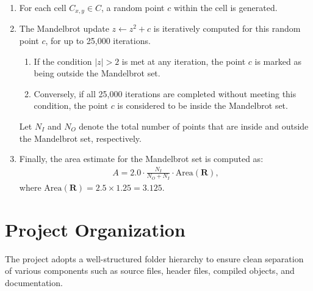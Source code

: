 \documentclass{article}
\begin{document}
\begin{enumerate}
    \item For each cell $C_{x, y} \in C$, a random point $c$ within the cell is generated.
    \item The Mandelbrot update $z \leftarrow z^2 + c$ is iteratively computed for this random point $c$, for up to 25,000 iterations.
    \begin{enumerate}
        \item If the condition $\lvert z \rvert > 2$ is met at any iteration, the point $c$ is marked as being outside the Mandelbrot set.
        \item Conversely, if all 25,000 iterations are completed without meeting this condition, the point $c$ is considered to be inside the Mandelbrot set.
    \end{enumerate}
    
    Let $N_I$ and $N_O$ denote the total number of points that are inside and outside the Mandelbrot set, respectively.
    \item Finally, the area estimate for the Mandelbrot set is computed as:
    \begin{align*}
        A = 2.0 \cdot \frac{N_I}{N_O + N_I} \cdot \text{Area}(\textbf{R}),
    \end{align*}
    where $\text{Area}(\textbf{R}) = 2.5 \times 1.25 = 3.125$.
\end{enumerate}

\section{Project Organization}

The project adopts a well-structured folder hierarchy to ensure clean separation of various components such as source files, header files, compiled objects, and documentation. 
\end{document}
